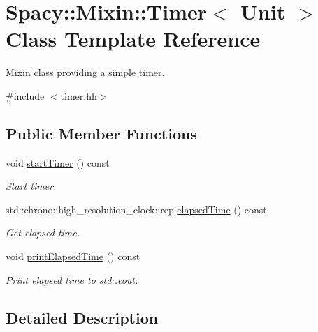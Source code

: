 \hypertarget{classSpacy_1_1Mixin_1_1Timer}{}\section{Spacy\+:\+:Mixin\+:\+:Timer$<$ Unit $>$ Class Template Reference}
\label{classSpacy_1_1Mixin_1_1Timer}


Mixin class providing a simple timer.  




{\ttfamily \#include $<$timer.\+hh$>$}

\subsection*{Public Member Functions}
\begin{DoxyCompactItemize}
\item 
\hypertarget{classSpacy_1_1Mixin_1_1Timer_acf3c292b6d482c7c4ded5f961be4bc4b}{}void \hyperlink{classSpacy_1_1Mixin_1_1Timer_acf3c292b6d482c7c4ded5f961be4bc4b}{start\+Timer} () const \label{classSpacy_1_1Mixin_1_1Timer_acf3c292b6d482c7c4ded5f961be4bc4b}

\begin{DoxyCompactList}\small\item\em Start timer. \end{DoxyCompactList}\item 
std\+::chrono\+::high\+\_\+resolution\+\_\+clock\+::rep \hyperlink{classSpacy_1_1Mixin_1_1Timer_ab27a20d8e1e9bc90ea56cb18ff752798_ab27a20d8e1e9bc90ea56cb18ff752798}{elapsed\+Time} () const 
\begin{DoxyCompactList}\small\item\em Get elapsed time. \end{DoxyCompactList}\item 
\hypertarget{classSpacy_1_1Mixin_1_1Timer_a3b79b35213702118d0823f6040d5a315}{}void \hyperlink{classSpacy_1_1Mixin_1_1Timer_a3b79b35213702118d0823f6040d5a315}{print\+Elapsed\+Time} () const \label{classSpacy_1_1Mixin_1_1Timer_a3b79b35213702118d0823f6040d5a315}

\begin{DoxyCompactList}\small\item\em Print elapsed time to std\+::cout. \end{DoxyCompactList}\end{DoxyCompactItemize}


\subsection{Detailed Description}
